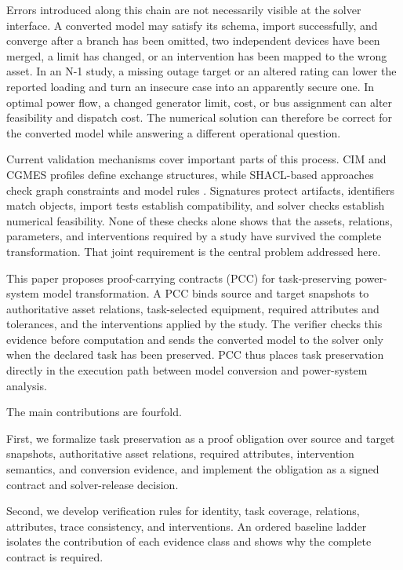 \documentclass[preprint,12pt]{elsarticle}
\begin{document}
Errors introduced along this chain are not necessarily visible at the solver interface. A converted model may satisfy its schema, import successfully, and converge after a branch has been omitted, two independent devices have been merged, a limit has changed, or an intervention has been mapped to the wrong asset. In an N-1 study, a missing outage target or an altered rating can lower the reported loading and turn an insecure case into an apparently secure one. In optimal power flow, a changed generator limit, cost, or bus assignment can alter feasibility and dispatch cost. The numerical solution can therefore be correct for the converted model while answering a different operational question.

Current validation mechanisms cover important parts of this process. CIM and CGMES profiles define exchange structures, while SHACL-based approaches check graph constraints and model rules \citep{larhrib2020shacl,larhrib2024smartgrids,li2022shacl}. Signatures protect artifacts, identifiers match objects, import tests establish compatibility, and solver checks establish numerical feasibility. None of these checks alone shows that the assets, relations, parameters, and interventions required by a study have survived the complete transformation. That joint requirement is the central problem addressed here.

This paper proposes proof-carrying contracts (PCC) for task-preserving power-system model transformation. A PCC binds source and target snapshots to authoritative asset relations, task-selected equipment, required attributes and tolerances, and the interventions applied by the study. The verifier checks this evidence before computation and sends the converted model to the solver only when the declared task has been preserved. PCC thus places task preservation directly in the execution path between model conversion and power-system analysis.

The main contributions are fourfold.

First, we formalize task preservation as a proof obligation over source and target snapshots, authoritative asset relations, required attributes, intervention semantics, and conversion evidence, and implement the obligation as a signed contract and solver-release decision.

Second, we develop verification rules for identity, task coverage, relations, attributes, trace consistency, and interventions. An ordered baseline ladder isolates the contribution of each evidence class and shows why the complete contract is required.
\end{document}
